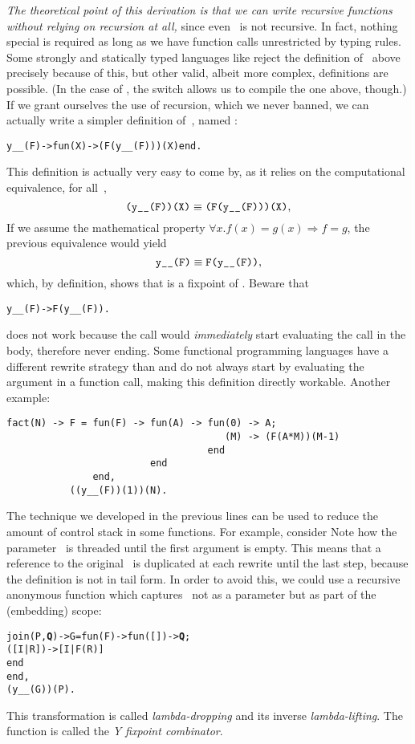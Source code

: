 \emph{The theoretical point of this derivation is that we can write
  recursive functions without relying on recursion at all,} since even
~is not recursive. In fact, nothing special is required
as long as we have function calls unrestricted by typing rules. Some
strongly and statically typed languages like \OCaml reject the
definition of~ above precisely because of this, but other
valid, albeit more complex, definitions are possible. (In the case of
\OCaml, the switch  allows us to compile the one
above, though.) If we grant ourselves the use of recursion, which we
never banned, we can actually write a simpler definition
of~, named :
\begin{alltt}
y__(F) -> fun(X) -> (F(y__(F)))(X) end.\hfill% \emph{Recursive}
\end{alltt}
This definition is actually very easy to come by, as it relies on the
computational equivalence, for all~,
\[
\texttt{(y\_\_(F))(X)} \mathrel{\equiv} \texttt{(F(y\_\_(F)))(X)},
\]
If we assume the mathematical property \(\forall x.f(x) = g(x)
\Rightarrow f = g\), the previous equivalence would yield
\[
\texttt{y\_\_(F)} \mathrel{\equiv} \texttt{F(y\_\_(F))},
\]
which, by definition, shows that  is a fixpoint of
. Beware that
\begin{alltt}
y__(F) -> F(y__(F)).\hfill% \emph{Infinite loop}
\end{alltt}
does not work because the call  would
\emph{immediately} start evaluating the call  in
the body, therefore never ending. Some functional programming
languages have a different rewrite strategy than \Erlang and do not
always start by evaluating the argument in a function call, making
this definition directly workable. Another example:
\begin{verbatim}
fact(N) -> F = fun(F) -> fun(A) -> fun(0) -> A;
                                      (M) -> (F(A*M))(M-1)
                                   end
                         end
               end,
           ((y__(F))(1))(N).
\end{verbatim}
The technique we developed in the previous lines can be used to reduce
the amount of control stack in some functions. For example, consider
 Note how the parameter~ is
threaded until the first argument is empty. This means that a
reference to the original~ is duplicated at each rewrite
until the last step, because the definition is not in tail form. In
order to avoid this, we could use a recursive anonymous function which
captures~ not as a parameter but as part of the (embedding)
scope:
\begin{alltt}
join(P,\textbf{Q}) -> G = fun(F) -> fun(   []) -> \textbf{Q};\hfill% Q \emph{in scope}
                              ([I|R]) -> [I|F(R)]
                           end
                 end,
             (y\_\_(G))(P).
\end{alltt}
This transformation is called \emph{lambda\hyp{}dropping} and its
inverse \emph{lambda\hyp{}lifting}. The function  is
called the \emph{Y fixpoint combinator}.

